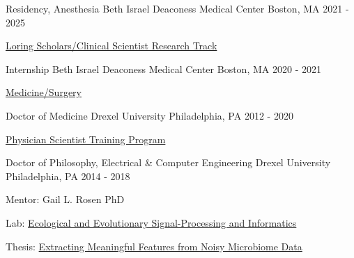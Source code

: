

\begin{cventries}

  \cventry
    {Residency, Anesthesia}
    {Beth Israel Deaconess Medical Center}
    {Boston, MA}
    {2021 - 2025}
    {
    \begin{cvitems}
    \item \href{https://www.bidmc.org/medical-education/medical-education-by-department/anesthesia-critical-care-and-pain-medicine/anesthesia-residency-program/research-and-other-opportunities/clinician-scientist-track}{Loring Scholars/Clinical Scientist Research Track}
    \end{cvitems}
    }
    
    \cventry
    {Internship}
    {Beth Israel Deaconess Medical Center}
    {Boston, MA}
    {2020 - 2021}
    {
    \begin{cvitems}
    \item \href{https://www.bidmc.org/medical-education/medical-education-by-department/anesthesia-critical-care-and-pain-medicine/anesthesia-residency-program/research-and-other-opportunities/clinician-scientist-track}{Medicine/Surgery}
    \end{cvitems}
    }
 
   \cventry
    {Doctor of Medicine} %
    {Drexel University} %
    {Philadelphia, PA} %
    {2012 - 2020} %
    {
    \begin{cvitems} %
    \item \href{https://drexel.edu/medicine/academics/dual-degree-programs/md-phd/students-alumni/}{Physician Scientist Training Program}
    \end{cvitems}
    }
    
  \cventry
    {Doctor of Philosophy, Electrical \& Computer Engineering} %
    {Drexel University} %
    {Philadelphia, PA} %
    {2014 - 2018} %
    {
      \begin{cvitems} %
         \item Mentor: Gail L. Rosen PhD
         \item Lab: \href{http://drexeleesi.com/}{Ecological and Evolutionary Signal-Processing and Informatics}
	 \item Thesis: \href{https://idea.library.drexel.edu/islandora/object/idea\%3A8189}{Extracting Meaningful Features from Noisy Microbiome Data}
      \end{cvitems}
    }
    

\end{cventries}
